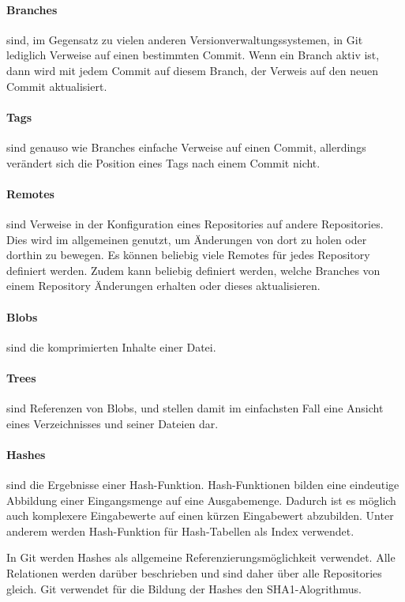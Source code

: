 \paragraph{Branches} sind, im Gegensatz zu vielen anderen Versionverwaltungssystemen, in Git lediglich Verweise auf einen 
bestimmten Commit. Wenn ein Branch aktiv ist, dann wird mit jedem Commit auf diesem Branch, der Verweis auf den neuen 
Commit aktualisiert.

\paragraph{Tags} sind genauso wie Branches einfache Verweise auf einen Commit, allerdings verändert sich die Position 
eines Tags nach einem Commit nicht.

\paragraph{Remotes} sind Verweise in der Konfiguration eines Repositories auf andere Repositories. Dies wird im 
allgemeinen genutzt, um Änderungen von dort zu holen oder dorthin zu bewegen. Es können beliebig viele Remotes für jedes 
Repository definiert werden. Zudem kann beliebig definiert werden, welche Branches von einem Repository Änderungen 
erhalten oder dieses aktualisieren.

\paragraph{Blobs} sind die komprimierten Inhalte einer Datei.

\paragraph{Trees} sind Referenzen von Blobs, und stellen damit im einfachsten Fall eine Ansicht eines Verzeichnisses und 
seiner Dateien dar.

\paragraph{Hashes} sind die Ergebnisse einer Hash-Funktion. Hash-Funktionen bilden eine eindeutige Abbildung einer Eingangsmenge auf eine Ausgabemenge. Dadurch ist es möglich auch komplexere Eingabewerte auf einen kürzen Eingabewert abzubilden. Unter anderem werden Hash-Funktion für Hash-Tabellen als Index verwendet. 

In Git werden Hashes als allgemeine Referenzierungsmöglichkeit verwendet. Alle Relationen werden darüber beschrieben und sind daher über alle Repositories gleich. Git verwendet für die Bildung der Hashes den SHA1-Alogrithmus. 

